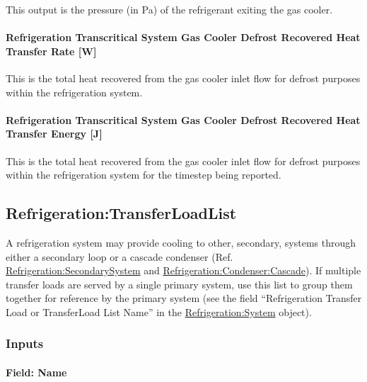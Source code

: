 This output is the pressure (in Pa) of the refrigerant exiting the gas cooler.

\paragraph{Refrigeration Transcritical System Gas Cooler Defrost Recovered Heat Transfer Rate {[}W{]}}\label{refrigeration-transcritical-system-gas-cooler-defrost-recovered-heat-transfer-rate-w}

This is the total heat recovered from the gas cooler inlet flow for defrost purposes within the refrigeration system.

\paragraph{Refrigeration Transcritical System Gas Cooler Defrost Recovered Heat Transfer Energy {[}J{]}}\label{refrigeration-transcritical-system-gas-cooler-defrost-recovered-heat-transfer-energy-j}

This is the total heat recovered from the gas cooler inlet flow for defrost purposes within the refrigeration system for the timestep being reported.

\subsection{Refrigeration:TransferLoadList}\label{refrigerationtransferloadlist}

A refrigeration system may provide cooling to other, secondary, systems through either a secondary loop or a cascade condenser (Ref. \hyperref[refrigerationsecondarysystem]{Refrigeration:SecondarySystem} and \hyperref[refrigerationcondensercascade]{Refrigeration:Condenser:Cascade}). If multiple transfer loads are served by a single primary system, use this list to group them together for reference by the primary system (see the field ``Refrigeration Transfer Load or TransferLoad List Name'' in the \hyperref[refrigerationsystem]{Refrigeration:System} object).

\subsubsection{Inputs}\label{inputs-13-011}

\paragraph{Field: Name}\label{field-name-14-007}

